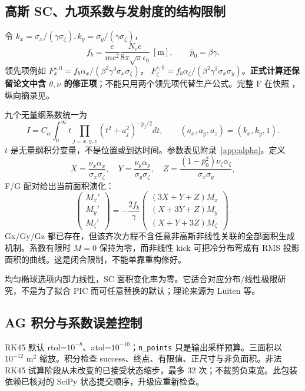 \subsection{高斯 SC、九项系数与发射度的结构限制}
令 $k_x=\sigma_x/(\gamma\sigma_\zeta),k_y=\sigma_y/(\gamma\sigma_\zeta)$，
\begin{equation}
 f_b=\frac{e}{mc^2}\frac{N_e e}{8\pi\sqrt\pi\epsilon_0}\ [\mathrm m],\qquad\bar p_0=\beta\gamma.
\end{equation}
领先项例如 $F_x^{s,0}=f_b\alpha_x/(\beta^2\gamma^3\sigma_x\sigma_\zeta)$，
$F_\zeta^{s,0}=f_b\alpha_\zeta/(\beta^2\gamma^3\sigma_x\sigma_y)$。\textbf{正式计算还保留论文中含 $\theta,\nu$ 的修正项}；不能只用两个领先项代替生产公式。完整 F 在快照 ，纵向摘录见。

九个无量纲系数统一为
\begin{equation}
 I=C_\alpha\int_0^\infty t\prod_{j=x,y,z}(t^2+a_j^2)^{-p_j/2}dt,
 \qquad(a_x,a_y,a_z)=(k_x,k_y,1).
 \label{eq:alpha}
\end{equation}
$t$ 是无量纲积分变量，不是位置或到达时间。参数表见附录~\ref{app:alpha}。定义
\begin{equation}
 X=\frac{\nu_x\alpha_x}{\sigma_x\sigma_\zeta},\quad
 Y=\frac{\nu_y\alpha_y}{\sigma_y\sigma_\zeta},\quad
 Z=\frac{(1-\bar p_0^2)\nu_\zeta\alpha_\zeta}{\sigma_x\sigma_y},
\end{equation}
F/G 配对给出当前面积演化：
\begin{equation}
 \begin{pmatrix}M_x'\\M_y'\\M_\zeta'\end{pmatrix}
 =-\frac{2f_b}{\gamma}\begin{pmatrix}(3X+Y+Z)M_x\\(X+3Y+Z)M_y\\(X+Y+3Z)M_\zeta\end{pmatrix}.
 \label{eq:grates}
\end{equation}
Gx/Gy/Gz 都已存在，但该齐次方程不含任意非高斯非线性关联的全部面积生成机制。系数有限时 $M=0$ 保持为零，而非线性 kick 可把冷分布弯成有 RMS 投影面积的曲线。这是闭合限制，不能单靠重构修好。

均匀椭球选项内部力线性，SC 面积变化率为零。它适合对应分布/线性极限研究，不是为了拟合 PIC 而可任意替换的默认；理论来源为 Luiten 等\cite{luiten}。

\subsection{AG 积分与系数误差控制}
RK45 默认 rtol=$10^{-8}$、atol=$10^{-10}$；\texttt{n\_points} 只是输出采样预算。三面积以 $10^{-12}$ m$^2$ 缩放。积分检查 success、终点、有限值、正尺寸与非负面积。非法 RK45 试算阶段从未改变的已接受状态缩步，最多 32 次；不裁剪负束宽。此包装依赖已核对的 SciPy 状态提交顺序，升级应重新检查。

